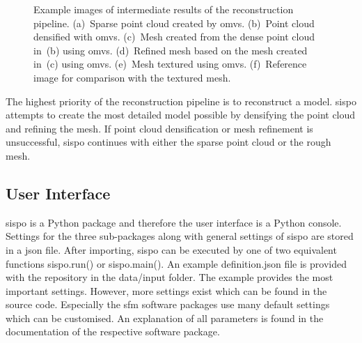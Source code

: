 \begin{figure}[htbp]
\begin{subfigure}[b]{0.4\textwidth}
        \caption{}
        \label{fig:recon_step_img}
    \end{subfigure}
    \caption{Example images of intermediate results of the reconstruction pipeline. (a)~Sparse point cloud created by \gls{omvs}. (b)~Point cloud densified with \gls{omvs}. (c)~Mesh created from the dense point cloud in~(b) using \gls{omvs}. (d)~Refined mesh based on the mesh created in~(c) using \gls{omvs}. (e)~Mesh textured using \gls{omvs}. (f)~Reference image for comparison with the textured mesh.}
    \label{fig:recon_steps}
\end{figure}

The highest priority of the reconstruction pipeline is to reconstruct a model. \Gls{sispo} attempts to create the most detailed model possible by densifying the point cloud and refining the mesh. If point cloud densification or mesh refinement is unsuccessful, \gls{sispo} continues with either the sparse point cloud or the rough mesh.

\subsection{User Interface}
\Gls{sispo} is a Python package and therefore the user interface is a Python console. Settings for the three sub-packages along with general settings of \gls{sispo} are stored in a \gls{json} file. After importing, \gls{sispo} can be executed by one of two equivalent functions sispo.run() or sispo.main(). An example definition.json file is provided with the repository in the data/input folder. The example provides the most important settings. However, more settings exist which can be found in the source code. Especially the \gls{sfm} software packages use many default settings which can be customised. An explanation of all parameters is found in the documentation of the respective software package.

